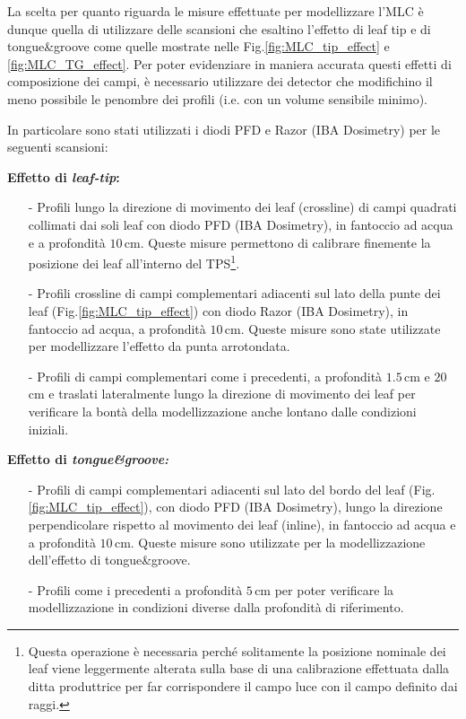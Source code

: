 La scelta per quanto riguarda le misure effettuate per modellizzare l'MLC è dunque quella di utilizzare delle scansioni che esaltino l'effetto di leaf tip e di tongue\&{}groove come quelle mostrate nelle Fig.\ref{fig:MLC_tip_effect} e \ref{fig:MLC_TG_effect}. Per poter evidenziare in maniera accurata questi effetti di composizione dei campi, è necessario utilizzare dei detector che modifichino il meno possibile le penombre dei profili (i.e. con un volume sensibile minimo).

In particolare sono stati utilizzati i diodi PFD e Razor (IBA Dosimetry) per le seguenti scansioni:\vspace*{.2cm}

\textbf{Effetto di \textit{leaf-tip}:}
\begin{itemize}
\item[-] Profili lungo la direzione di movimento dei leaf (crossline) di campi quadrati collimati dai soli leaf con diodo PFD (IBA Dosimetry), in fantoccio ad acqua e a profondità $10\,$cm. Queste misure permettono di calibrare finemente la posizione dei leaf all'interno del TPS\footnote{Questa operazione è necessaria perché solitamente la posizione nominale dei leaf viene leggermente alterata sulla base di una calibrazione effettuata dalla ditta produttrice per far corrispondere il campo luce con il campo definito dai raggi.}.
\item[-] Profili crossline di campi complementari adiacenti sul lato della punte dei leaf (Fig.\ref{fig:MLC_tip_effect}) con diodo Razor (IBA Dosimetry), in fantoccio ad acqua, a profondità $10\,$cm. Queste misure sono state utilizzate per modellizzare l'effetto da punta arrotondata.
\item[-] Profili di campi complementari come i precedenti, a profondità $1.5\,$cm e $20\,$cm e traslati lateralmente lungo la direzione di movimento dei leaf per verificare la bontà della modellizzazione anche lontano dalle condizioni iniziali.
\end{itemize}

\textbf{Effetto di \textit{tongue\&{}groove:}}
\begin{itemize}
\item[-] Profili di campi complementari adiacenti sul lato del bordo del leaf (Fig.\ref{fig:MLC_tip_effect}), con diodo PFD (IBA Dosimetry), lungo la direzione perpendicolare rispetto al movimento dei leaf (inline), in fantoccio ad acqua e a profondità $10\,$cm. Queste misure sono utilizzate per la modellizzazione dell'effetto di tongue\&{}groove.
\item[-] Profili come i precedenti a profondità $5\,$cm per poter verificare la modellizzazione in condizioni diverse dalla profondità di riferimento.
\end{itemize}




